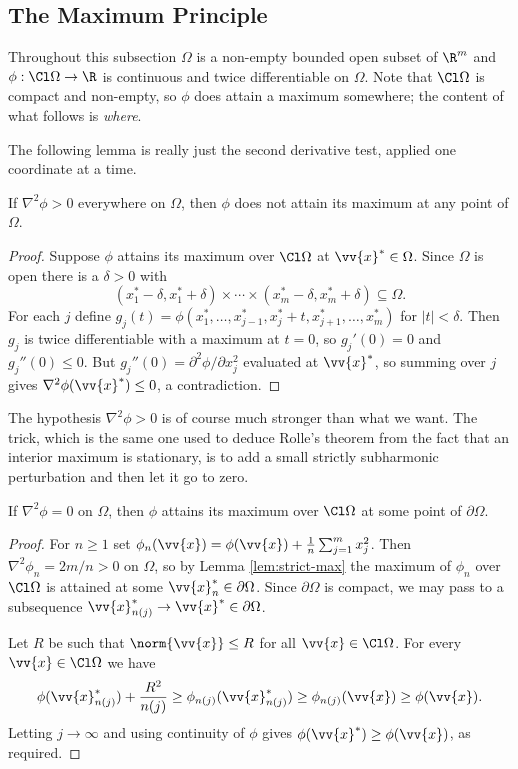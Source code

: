\subsection{The Maximum Principle}

Throughout this subsection $\Omega$ is a non-empty bounded open subset of $\R^m$ and $\phi : \Cl \Omega \to \R$ is continuous and twice differentiable on $\Omega$. Note that $\Cl\Omega$ is compact and non-empty, so $\phi$ does attain a maximum somewhere; the content of what follows is \emph{where}.

The following lemma is really just the second derivative test, applied one coordinate at a time.

\begin{lemma}\label{lem:strict-max}
	If $\nabla^2 \phi > 0$ everywhere on $\Omega$, then $\phi$ does not attain its maximum at any point of $\Omega$.
\end{lemma}

\begin{proof}
	Suppose $\phi$ attains its maximum over $\Cl\Omega$ at $\vv{x}^* \in \Omega$. Since $\Omega$ is open there is a $\delta>0$ with
	$$(x_1^*-\delta, x_1^*+\delta) \times \cdots \times (x_m^*-\delta,x_m^*+\delta) \subseteq \Omega.$$
	For each $j$ define $g_j(t) = \phi(x_1^*, \ldots, x_{j-1}^*, x_j^*+t, x_{j+1}^*,\ldots,x_m^*)$ for $|t|<\delta$. Then $g_j$ is twice differentiable with a maximum at $t=0$, so $g_j'(0) = 0$ and $g_j''(0) \leq 0$. But $g_j''(0) = \partial^2\phi/\partial x_j^2$ evaluated at $\vv{x}^*$, so summing over $j$ gives $\nabla^2\phi(\vv{x}^*) \leq 0$, a contradiction.
\end{proof}

The hypothesis $\nabla^2 \phi > 0$ is of course much stronger than what we want. The trick, which is the same one used to deduce Rolle's theorem from the fact that an interior maximum is stationary, is to add a small strictly subharmonic perturbation and then let it go to zero.

\begin{theorem}\label{thm:max-principle}
	If $\nabla^2 \phi = 0$ on $\Omega$, then $\phi$ attains its maximum over $\Cl\Omega$ at some point of $\partial\Omega$.
\end{theorem}

\begin{proof}
	For $n \geq 1$ set $\phi_n(\vv{x}) = \phi(\vv{x}) + \tfrac{1}{n}\sum_{j=1}^m x_j^2$. Then $\nabla^2 \phi_n = 2m/n > 0$ on $\Omega$, so by Lemma \ref{lem:strict-max} the maximum of $\phi_n$ over $\Cl\Omega$ is attained at some $\vv{x}_n^* \in \partial\Omega$. Since $\partial \Omega$ is compact, we may pass to a subsequence $\vv{x}_{n(j)}^* \to \vv{x}^* \in \partial\Omega$.

	Let $R$ be such that $\norm{\vv{x}} \leq R$ for all $\vv{x} \in \Cl\Omega$. For every $\vv{x} \in \Cl\Omega$ we have
	$$\phi(\vv{x}_{n(j)}^*) + \frac{R^2}{n(j)} \geq \phi_{n(j)}(\vv{x}_{n(j)}^*) \geq \phi_{n(j)}(\vv{x}) \geq \phi(\vv{x}).$$
	Letting $j \to \infty$ and using continuity of $\phi$ gives $\phi(\vv{x}^*) \geq \phi(\vv{x})$, as required.
\end{proof}

